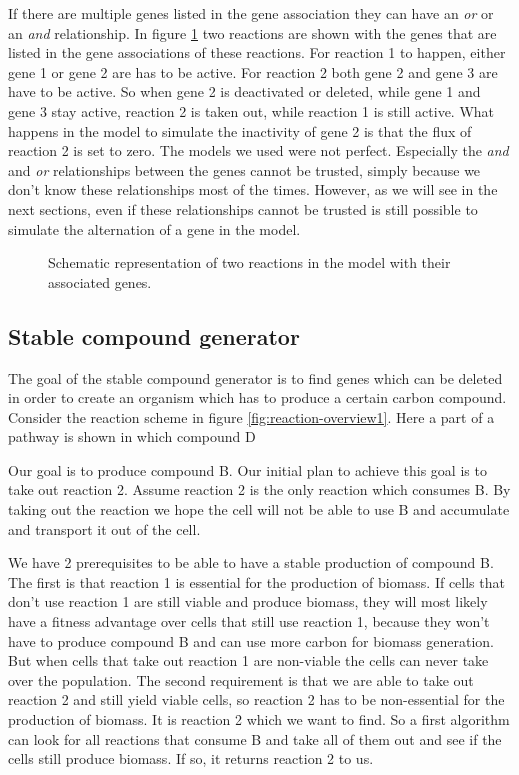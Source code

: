 \documentclass[12pt]{report}
\begin{document}
If there are multiple genes listed in the gene association they can have an \emph{or} or an \emph{and} relationship.
In figure \ref{fig:genes1}  two reactions are shown with the genes that are listed in the gene associations of these reactions.
For reaction 1 to happen, either gene 1 or gene 2 are has to be active. For reaction 2 both gene 2 and gene 3 are have to be active. So when gene 2 is deactivated or deleted, while gene 1 and gene 3 stay active, reaction 2 is taken out, while reaction 1 is still active. What happens in the model to simulate the inactivity of gene 2 is that the flux of reaction 2 is set to zero.
The models we used were not perfect. Especially the \emph{and} and \emph{or} relationships between the genes cannot be trusted, simply because we don't know these relationships most of the times.
However, as we will see in the next sections, even if these relationships cannot be trusted is still possible to simulate the alternation of a gene in the model.

\begin{figure}[hbtp]
  \centering
     
      \caption{Schematic representation of two reactions in the model with their associated genes.}
  \label{fig:genes1}
\end{figure}



\subsection{Stable compound generator}
The goal of the stable compound generator is to find genes which can be deleted in order to create an organism which has to produce a certain carbon compound. Consider the reaction scheme in figure \ref{fig:reaction-overview1}. Here a part of a pathway is shown in which compound D 

Our goal is to produce compound B. Our initial plan to achieve this goal is to take out reaction 2. Assume reaction 2 is the only reaction which consumes B. By taking out the reaction we hope the cell will not be able to use B and accumulate and transport it out of the cell.

We have 2 prerequisites to be able to have a stable production of compound B. The first is that reaction 1 is essential for the production of biomass. If cells that don't use reaction 1 are still viable and produce biomass, they will most likely have a fitness advantage over cells that still use reaction 1, because they won't have to produce compound B and can use more carbon for biomass generation. But when cells that take out reaction 1 are non-viable the cells can never take over the population.
The second requirement is that we are able to take out reaction 2 and still yield viable cells, so reaction 2 has to be non-essential for the production of biomass. It is reaction 2 which we want to find. So a first algorithm can look for all reactions that consume B and take all of them out and see if the cells still produce biomass. If so, it returns reaction 2 to us.
\end{document}
